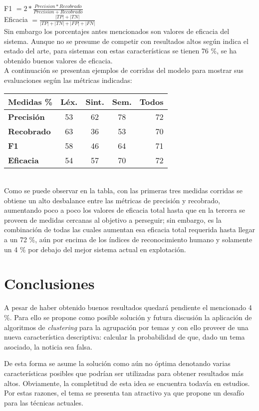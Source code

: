 \documentclass{llncs}
\begin{document}
\begin{multicols}{2}[]
F1  $= 2 * \frac{Precision * Recobrado}{Precision + Recobrado}$\\

Eficacia $ = \frac{|TP| + |TN|}{|TP| + |TN| + |FP| + |FN|}$\\

Sin embargo los porcentajes antes mencionados son valores de eficacia del sistema. Aunque no se presume de competir con resultados altos seg\'un indica el estado del arte, para
sistemas con estas caracter\'isticas se tienen 76 \%, se ha obtenido buenos valores de eficacia. \\

A continuaci\'on se presentan ejemplos de corridas del modelo para mostrar sus evaluaciones seg\'un las m\'etricas indicadas:\\

\begin{tabular}{l|c|c|c|r} %
	\hline
	\textbf{Medidas \%} & \textbf{L\'ex.} & \textbf{Sint.} & \textbf{Sem.} & \textbf{Todos}\\
	\hline
	\textbf{Precisi\'on} & 53 & 62 & 78 & 72\\
	\hline
	\textbf{Recobrado} & 63 & 36 & 53 & 70\\
	\hline
	\textbf{F1} & 58 & 46 & 64 & 71\\
	\hline
	\textbf{Eficacia} & 54 & 57 & 70 & 72\\
	\hline
\end{tabular}\\

Como se puede observar en la tabla, con las primeras tres medidas corridas se obtiene un alto desbalance entre las m\'etricas de precisi\'on y recobrado, aumentando poco a poco los
valores de eficacia total hasta que en la tercera se proveen de medidas cercanas al objetivo a perseguir; sin embargo, es la combinaci\'on de todas las cuales aumentan esa eficacia total
requerida hasta llegar a un 72 \%, a\'un por encima de los \'indices de reconocimiento humano y solamente un 4 \% por debajo del mejor sistema actual en explotaci\'on.

\section{Conclusiones}

A pesar de haber obtenido buenos resultados quedar\'a pendiente el mencionado 4 \%. Para ello se propone como posible soluci\'on y futura discusi\'on la aplicaci\'on de algoritmos de
\textit{clustering} para la agrupaci\'on por temas y con ello proveer de una nueva caracter\'istica descriptiva: calcular la probabilidad de que, dado un tema asociado, la noticia sea falsa.

De esta forma se asume la soluci\'on como a\'un no \'optima denotando varias caracter\'isticas posibles que podr\'ian ser utilizadas para obtener resultados m\'as altos. Obviamente,
la completitud de esta idea se encuentra todav\'ia en estudios. Por estas razones, el tema se presenta tan atractivo ya que propone un desaf\'io para las t\'ecnicas actuales.

\end{multicols}



\end{document}
